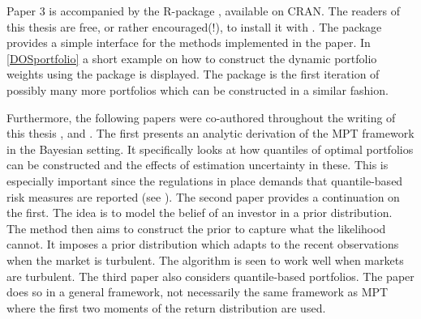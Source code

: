 \documentclass[12pt, oneside]{book}\usepackage{knitr}
\begin{document}
{Paper 3 is accompanied by the R-package \citet{DOSPortfolio}, available on CRAN. 
The readers of this thesis are free, or rather encouraged(!), to install it with \hlstd{(}\hlstd{)}. 
The package provides a simple interface for the methods implemented in the paper. 
In \ref{DOSportfolio} a short example on how to construct the dynamic portfolio weights using the package is displayed. 
The package is the first iteration of possibly many more portfolios which can be constructed in a similar fashion.\newpage
\begin{knitrout}\small
{}\color{fgcolor}
\end{knitrout}
Furthermore, the following papers were co-authored throughout the writing of this thesis \cite{bodnar2020quantile}, \cite{bodnar2021bayesian}  and \cite{bodnar2021quantile}.
The first presents an analytic derivation of the MPT framework in the Bayesian setting. 
It specifically looks at how quantiles of optimal portfolios can be constructed and the effects of estimation uncertainty in these. 
This is especially important since the regulations in place demands that quantile-based risk measures are reported (see \citet{basel4}).
The second paper provides a continuation on the first. 
The idea is to model the belief of an investor in a prior distribution. 
The method then aims to construct the prior to capture what the likelihood cannot. 
It imposes a prior distribution which adapts to the recent observations when the market is turbulent. 
The algorithm is seen to work well when markets are turbulent.
The third paper also considers quantile-based portfolios. 
The paper does so in a general framework, not necessarily the same framework as MPT where the first two moments of the return distribution are used.



}
\end{document}
